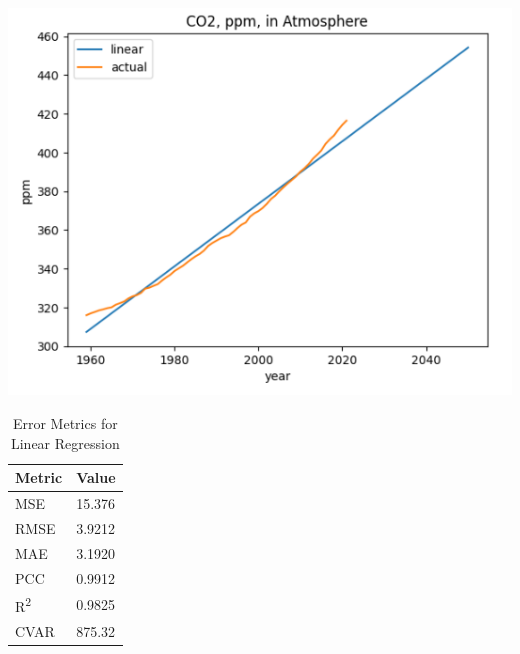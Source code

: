 \documentclass[12pt]{mcmthesis}
\begin{document}
    \begin{table}[h]
        \begin{minipage}{0.7\linewidth}
            \centering
            \includegraphics[width=\textwidth]{linear}%
            \label{fig:co2_lr}
        \end{minipage}%
        \begin{minipage}{0.3\linewidth}
            \centering
            \begin{tabular}{ll}
                \toprule
                Metric               & Value  \\
                \midrule
                MSE                  & 15.376 \\
                RMSE                 & 3.9212 \\
                MAE                  & 3.1920 \\
                PCC                  & 0.9912 \\
                R\textsuperscript{2} & 0.9825 \\
                CVAR                 & 875.32 \\
                \bottomrule
            \end{tabular}
            \vspace{8pt}
            \caption{Error Metrics for Linear Regression}
            \label{tab:co2_lr_err}
        \end{minipage}
    \end{table}
\end{document}
